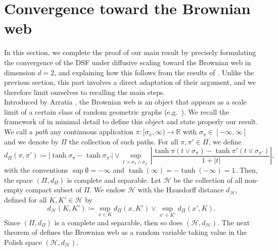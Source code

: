 \documentclass[a4paper, 11pt]{article}
\theoremstyle{plain}
\theoremstyle{definition}
\newcommand{\R}{\mathbb{R}}
\numberwithin{equation}{section}
\begin{document}
\section{Convergence toward the Brownian web}

\label{section_BW}

In this section, we complete the proof of our main result by precisely formulating the convergence of the DSF under diffusive scaling toward the Brownian web in dimension $d=2$, and explaining how this follows from the results of \cite{Dsf2d}. Unlike the previous section, this part involves a direct adaptation of their argument, and we therefore limit ourselves to recalling the main steps.\\

Introduced by Arratia \cite{arratia1979coalescing}, the Brownian web is an object that appears as a scale limit of a certain class of random geometric graphs (e.g.\ \cite{newmanconvergence}). We recall the framework of \cite{BrownianWeb} in minimal detail to define this object and state properly our result. We call a \emph{path} any continuous application $\pi:[\sigma_\pi,\infty)\to\R$ with $\sigma_\pi\in[-\infty,\infty]$ and we denote by $\Pi$ the collection of such paths. For all $\pi,\pi'\in\Pi$, we define
    \[d_\Pi(\pi,\pi')\coloneqq|\tanh\sigma_\pi-\tanh\sigma_{\pi'}|\vee \sup_{t>\sigma_\pi\wedge\sigma_{\pi'}}\left|\frac{\tanh\pi(t\vee\sigma_\pi)-\tanh\pi'(t\vee\sigma_{\pi'})}{1+|t|}\right|,\]
with the conventions $\sup\emptyset=-\infty$ and $\tanh(\infty)=-\tanh(-\infty)=1$. Then, the space $(\Pi,d_\Pi)$ is complete and separable. Let $\mathcal H$ be the collection of all non-empty compact subset of $\Pi$. We endow $\mathcal H$ with the Hausdorff distance $d_\mathcal H$, defined for all $K,K'\in\mathcal H$ by
    \[d_{\mathcal H}(K, K')\coloneqq\sup_{x\in K}d_\Pi(x, K')\vee\sup_{x'\in K'}d_\Pi(x', K).\]
Since $(\Pi, d_\Pi)$ is a complete and separable, then so does $(\mathcal H,d_\mathcal H)$. The next theorem of \cite{BrownianWeb} defines the Brownian web as a random variable taking value in the Polish space $(\mathcal H,d_\mathcal H)$.
\end{document}
